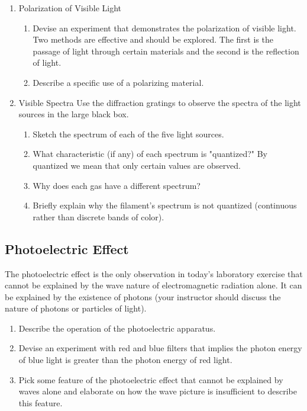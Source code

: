 \begin{multicols}{2}
\begin{enumerate}
	\item Polarization of Visible Light
	\begin{enumerate}
		\item Devise an experiment that demonstrates the polarization of visible light. Two methods are effective and should be explored. The first is the passage of light through certain materials and the second is the reflection of light.
		\item Describe a specific use of a polarizing material.
	\end{enumerate}
	
	\item Visible Spectra	
		Use the diffraction gratings to observe the spectra of the light sources in the large black box.
	\begin{enumerate}	
		\item Sketch the spectrum of each of the five light sources.
		\item What characteristic (if any) of each spectrum is "quantized?"  By quantized we mean that only certain values are observed.
		\item Why does each gas have a different spectrum?
		\item Briefly explain why the filament's spectrum is not quantized (continuous rather than discrete bands of color).
	\end{enumerate}
\end{enumerate}

\subsection {Photoelectric Effect}	
The photoelectric effect is the only observation in today's laboratory exercise that cannot be explained by the wave nature of electromagnetic radiation alone.  It can be explained by the existence of photons (your instructor should discuss the nature of photons or particles of light).
\begin{enumerate}
	\item Describe the operation of the photoelectric apparatus.
	\item Devise an experiment with red and blue filters that implies the photon energy of blue light is greater than the photon energy of red light.
	\item Pick some feature of the photoelectric effect that cannot be explained by waves alone and elaborate on how the wave picture is insufficient to describe this feature.
\end{enumerate}


\end{multicols}

